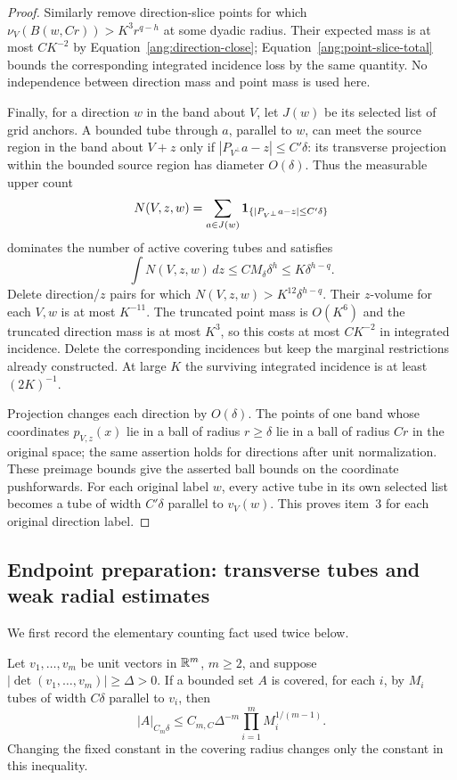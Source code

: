 \begin{proof}
Similarly remove direction-slice points for which
$\nu_V(B(w,Cr))>K^3r^{q-h}$ at some dyadic radius. Their expected
mass is at most $CK^{-2}$ by
Equation~\eqref{ang:direction-close}; Equation~\eqref{ang:point-slice-total}
bounds the corresponding integrated incidence loss by the same quantity.
No independence between direction mass and point mass is used here.

Finally, for a direction $w$ in the band about $V$, let $J(w)$ be its
selected list of grid anchors. A bounded tube through $a$, parallel to
$w$, can meet the source region in the band about $V+z$ only if
$|P_{V^\perp}a-z|\le C'\delta$: its transverse projection within the
bounded source region has diameter $O(\delta)$. Thus the measurable
upper count
\[
 N(V,z,w)=\sum_{a\in J(w)}
       \mathbf 1_{\{|P_{V^\perp}a-z|\le C'\delta\}}
\]
dominates the number of active covering tubes and satisfies
\[
 \int N(V,z,w)\,dz
       \le C M_\delta\delta^h\le K\delta^{h-q}.
\]
Delete direction/$z$ pairs for which
$N(V,z,w)>K^{12}\delta^{h-q}$. Their $z$-volume for each $V,w$
is at most $K^{-11}$. The truncated point mass is $O(K^6)$ and
the truncated direction mass is at most $K^3$, so this costs at most
$CK^{-2}$ in integrated incidence. Delete the corresponding incidences
but keep the marginal restrictions already constructed. At large $K$
the surviving integrated incidence is at least $(2K)^{-1}$.

Projection changes each direction by $O(\delta)$. The points of one
band whose coordinates $p_{V,z}(x)$ lie in a ball of radius $r\ge\delta$
lie in a ball of radius $Cr$ in the original space; the same assertion
holds for directions after unit normalization. These preimage bounds give
the asserted ball bounds on the coordinate pushforwards. For each original
label $w$, every active tube in its own selected list becomes a tube of
width $C'\delta$ parallel to $v_V(w)$. This proves item~3 for each
original direction label.
\end{proof}

\subsection{Endpoint preparation: transverse tubes and weak radial estimates}

We first record the elementary counting fact used twice below.

\begin{lemma}\label{ang:loomis-whitney}
Let $v_1,\ldots,v_m$ be unit vectors in $\mathbb R^m$, $m\ge2$, and suppose
$|\det(v_1,\ldots,v_m)|\ge\Delta>0$. If a bounded set $A$ is covered,
for each $i$, by $M_i$ tubes of width $C\delta$ parallel to $v_i$, then
\[
 |A|_{C_m\delta}\le C_{m,C}\Delta^{-m}
       \prod_{i=1}^m M_i^{1/(m-1)}.
\]
Changing the fixed constant in the covering radius changes only the
constant in this inequality.
\end{lemma}

